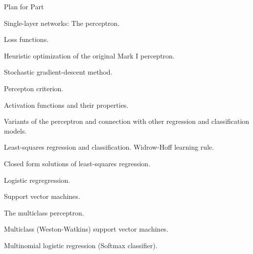 \begin{frame}{Plan for Part \thislecture}

\begin{itemize}
{\small
\item Single-layer networks: The perceptron.
\item Loss functions.
\item Heuristic optimization of the original Mark I perceptron.
\item Stochastic gradient-descent method.
\item Percepton criterion.
\item Activation functions and their properties.
\item Variants of the perceptron and connection with other regression and classification models.
    \begin{itemize}
    {\small
        \item Least-squares regression and classification. Widrow-Hoff learning rule.
        \item Closed form solutions of least-squares regression.
        \item Logistic regregression.
        \item Support vector machines.
    }
    \end{itemize}
\item The multiclass perceptron.
\item Multiclass (Weston-Watkins) support vector machines.
\item Multinomial logistic regression (Softmax classifier).
}
\end{itemize}

\end{frame}
